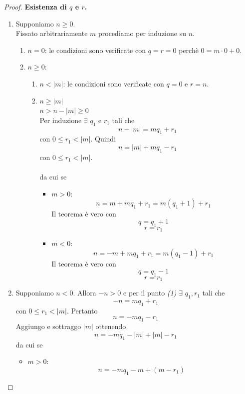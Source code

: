 \documentclass[a4paper,12pt, oneside]{book}
\begin{document}
\begin{proof}
	\textbf{Esistenza di $q$ e $r$.}
	\begin{enumerate}
		\item Supponiamo $n \geq 0$.\\
		      Fissato arbitrariamente $m$ procediamo per induzione su $n$.
		      \begin{enumerate}
			      \item $n = 0$: le condizioni sono verificate con $q = r = 0$ perchè $0 = m \cdot 0 + 0$.
			      \item $n \geq 0$: \begin{enumerate}
				            \item $n < |m|$: le condizioni sono verificate con $q = 0$ e $r = n$.
				            \item $n \geq |m|$\\
				                  $n > n - |m| \geq 0$\\
				                  Per induzione $\exists$ $q_1$ e $r_1$ tali che
				                  $$n - |m| = mq_1 + r_1$$
				                  con $0 \leq r_1 < |m|$.
				                  Quindi
				                  $$n = |m| + mq_1 - r_1$$
				                  con $0 \leq r_1 < |m|$.\\\\
				                  da cui se \begin{itemize}
					                  \item $m > 0$:
					                        $$n = m + mq_1 + r_1 = m (q_1 +1) + r_1$$
					                        Il teorema è vero con $$q = q_1 +1$$ $$r = r_1$$
					                  \item $m < 0$:
					                        $$n = -m + mq_1 + r_1 = m (q_1 -1) + r_1$$
					                        Il teorema è vero con $$q = q_1 -1$$ $$r = r_1$$
				                  \end{itemize}
			            \end{enumerate}
		      \end{enumerate}
		\item Supponiamo $n < 0$.
		      Allora $-n > 0$ e per il punto \textit{(1)} $\exists$ $q_1, r_1$ tali che
		      $$-n = mq_1 + r_1$$
		      con $0 \leq r_1 < |m|$.
		      Pertanto $$n = -mq_1 - r_1$$
		      Aggiungo e sottraggo $|m|$ ottenendo
		      $$n = -mq_1 -|m| + |m| - r_1$$
		      da cui se \begin{itemize}
			      \item $m > 0$:
			            $$n = -mq_1 - m + (m-r_1)$$

\end{itemize}
\end{enumerate}
\end{proof}
\end{document}
